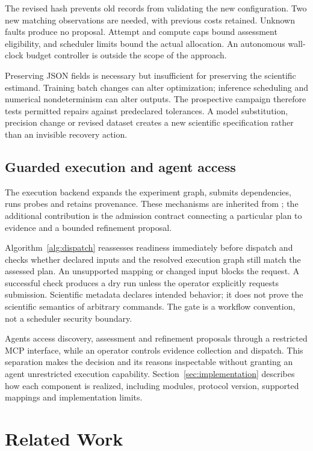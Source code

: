 The revised hash prevents old records from validating the new configuration. Two new matching observations are needed, with previous costs retained. Unknown faults produce no proposal. Attempt and compute caps bound assessment eligibility, and scheduler limits bound the actual allocation. An autonomous wall-clock budget controller is outside the scope of the approach.

Preserving JSON fields is necessary but insufficient for preserving the scientific estimand. Training batch changes can alter optimization; inference scheduling and numerical nondeterminism can alter outputs. The prospective campaign therefore tests permitted repairs against predeclared tolerances. A model substitution, precision change or revised dataset creates a new scientific specification rather than an invisible recovery action.

\subsection{Guarded execution and agent access}
The execution backend expands the experiment graph, submits dependencies, runs probes and retains provenance. These mechanisms are inherited from \upstream{}; the additional contribution is the admission contract connecting a particular plan to evidence and a bounded refinement proposal.

Algorithm~\ref{alg:dispatch} reassesses readiness immediately before dispatch and checks whether declared inputs and the resolved execution graph still match the assessed plan. An unsupported mapping or changed input blocks the request. A successful check produces a dry run unless the operator explicitly requests submission. Scientific metadata declares intended behavior; it does not prove the scientific semantics of arbitrary commands. The gate is a workflow convention, not a scheduler security boundary.

Agents access discovery, assessment and refinement proposals through a restricted MCP interface, while an operator controls evidence collection and dispatch. This separation makes the decision and its reasons inspectable without granting an agent unrestricted execution capability. Section~\ref{sec:implementation} describes how each component is realized, including modules, protocol version, supported mappings and implementation limits.

\section{Related Work}\label{sec:related}
